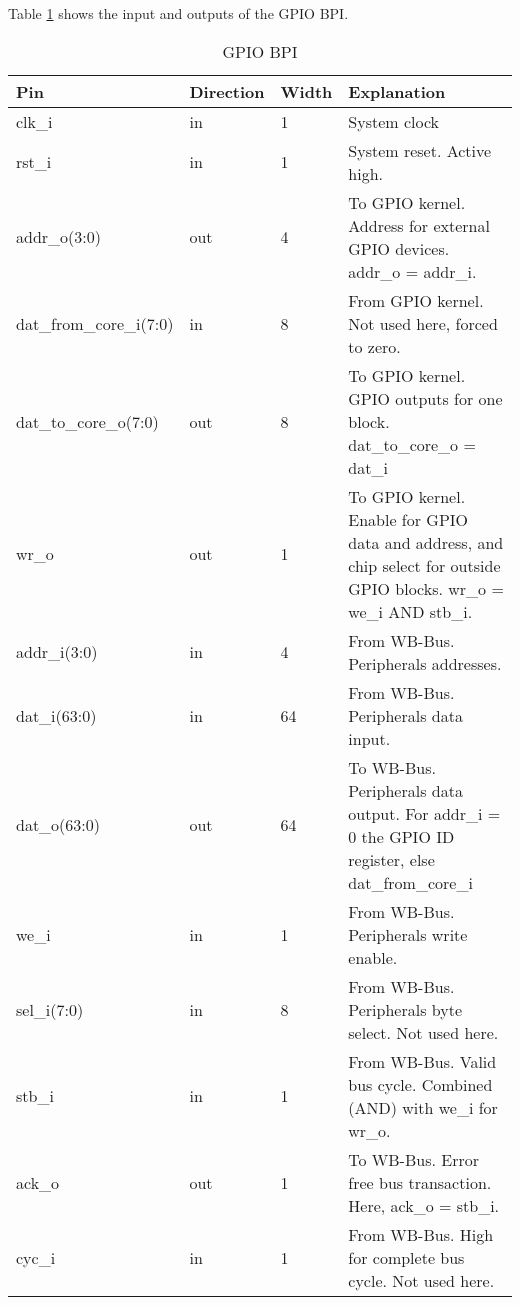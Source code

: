 
Table \ref{tab:asGpioPer05} shows the input and outputs of the GPIO BPI.
\begin{table}[H]
\caption{GPIO BPI}
\label{tab:asGpioPer05}
\centering
\begin{tabularx}{\textwidth}{|l |l |l |X|}
  \hline
  Pin & Direction & Width & Explanation \\
  \hline
  \hline
  clk\_i & in & 1 & System clock \\
  \hline
  rst\_i & in & 1 & System reset. Active high. \\
  \hline
  addr\_o(3:0) & out & 4 & To GPIO kernel. Address for external GPIO devices. addr\_o = addr\_i. \\
  \hline
  dat\_from\_core\_i(7:0) & in & 8 &  From GPIO kernel. Not used here, forced to zero. \\
  \hline
  dat\_to\_core\_o(7:0) & out & 8 &  To GPIO kernel. GPIO outputs for one block. dat\_to\_core\_o = dat\_i \\
  \hline
  wr\_o & out & 1 &  To GPIO kernel. Enable for GPIO data and address, and chip select for outside GPIO blocks. wr\_o = we\_i AND stb\_i. \\
  \hline
  addr\_i(3:0) & in & 4 &  From WB-Bus. Peripherals addresses. \\
  \hline
  dat\_i(63:0) & in & 64 &  From WB-Bus. Peripherals data input. \\
  \hline
  dat\_o(63:0) & out & 64 &  To WB-Bus. Peripherals data output. For addr\_i = 0 the GPIO ID register, else dat\_from\_core\_i \\
  \hline
  we\_i & in & 1 &  From WB-Bus. Peripherals write enable. \\
  \hline
  sel\_i(7:0) & in & 8 &  From WB-Bus. Peripherals byte select. Not used here. \\
  \hline
  stb\_i & in & 1 &  From WB-Bus. Valid bus cycle. Combined (AND) with we\_i for wr\_o.  \\
  \hline
  ack\_o & out & 1 &  To WB-Bus. Error free bus transaction. Here, ack\_o = stb\_i.  \\
  \hline
  cyc\_i & in & 1 &  From WB-Bus. High for complete bus cycle. Not used here.  \\
  \hline
\end{tabularx}
\end{table}
